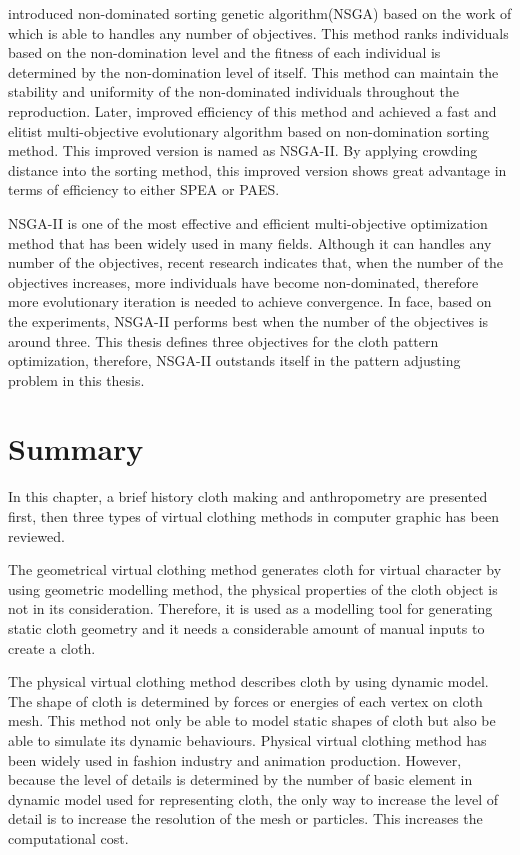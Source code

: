  introduced non-dominated sorting genetic algorithm(NSGA) based on the work of \citet{Goldberg91acomparative} which is able to handles any number of objectives. This method ranks individuals based on the non-domination level and the fitness of each individual is determined by the non-domination level of itself. This method can maintain the stability and uniformity of the non-dominated individuals throughout the reproduction. Later, \citet{Deb996017} improved efficiency of this method and achieved a fast and elitist multi-objective evolutionary algorithm based on non-domination sorting method. This improved version is named as NSGA-II. By applying crowding distance into the sorting method, this improved version shows great advantage in terms of efficiency to either SPEA or PAES. 

NSGA-II is one of the most effective and efficient multi-objective optimization method that has been widely used in many fields. Although it can handles any number of the objectives, recent research\citep{Ishibuchi4631121} indicates that, when the number of the objectives increases, more individuals have become non-dominated, therefore more evolutionary iteration is needed to achieve convergence. In face, based on the experiments, NSGA-II performs best when the number of the objectives is around three. This thesis defines three objectives for the cloth pattern optimization, therefore, NSGA-II outstands itself in the pattern adjusting problem in this thesis.

\section{Summary}

In this chapter, a brief history cloth making and anthropometry are presented first, then three types of virtual clothing methods in computer graphic has been reviewed. 

The geometrical virtual clothing method generates cloth for virtual character by using geometric modelling method, the physical properties of the cloth object is not in its consideration. Therefore, it is used as a modelling tool for generating static cloth geometry and it needs a considerable amount of manual inputs to create a cloth. 

The physical virtual clothing method describes cloth by using dynamic model. The shape of cloth is determined by forces or energies of each vertex on cloth mesh. This method not only be able to model static shapes of cloth but also be able to simulate its dynamic behaviours. Physical virtual clothing method has been widely used in fashion industry and animation production. However, because the level of  details is determined by the number of basic element in dynamic model used for representing cloth, the only way to increase the level of detail is to increase the resolution of the mesh or particles. This increases the computational cost. 

